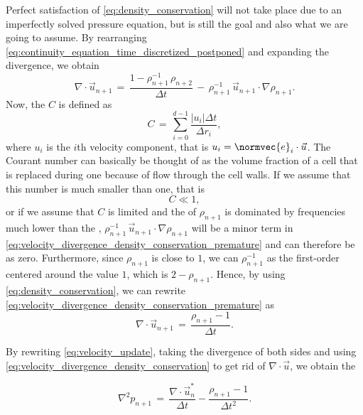 Perfect satisfaction of \eqref{eq:density_conservation} will not take place due to an imperfectly solved pressure equation, but is still the goal and also what we are going to assume. By rearranging \eqref{eq:continuity_equation_time_discretized_postponed} and expanding the divergence, we obtain
%
\begin{equation} \label{eq:velocity_divergence_density_conservation_premature}
\nabla\cdot\vec{u}_{n+1} \,=\, \frac{1-\rho_{n+1}^{-1}\,\rho_{n+2}}{\Delta t} \,-\, \rho_{n+1}^{-1}\,\vec{u}_{n+1}\cdot\nabla\rho_{n+1}.
\end{equation}
%
Now, the  $C$ is defined as
%
\begin{equation}
C \,=\, \sum_{i=0}^{d-1} \frac{|u_i|\Delta t}{\Delta r_i},
\end{equation}
%
where $u_i$ is the $i$th velocity component, that is $u_i = \normvec{e}_i\cdot\vec{u}$. The Courant number can basically be thought of as the volume fraction of a cell that is replaced during one \timestep because of flow through the cell walls. If we assume that this number is much smaller than one, that is
%
\begin{equation}
C \ll 1,
\end{equation}
%
or if we assume that $C$ is limited and the \spectrum of $\rho_{n+1}$ is dominated by frequencies much lower than the , $\rho_{n+1}^{-1}\,\vec{u}_{n+1}\cdot\nabla\rho_{n+1}$ will be a minor term in \eqref{eq:velocity_divergence_density_conservation_premature} and can therefore be \approximated as zero. Furthermore, since $\rho_{n+1}$ is close to $1$, we can \approximate $\rho_{n+1}^{-1}$ as the first-order  centered around the value $1$, which is $2-\rho_{n+1}$. Hence, by using \eqref{eq:density_conservation}, we can rewrite \eqref{eq:velocity_divergence_density_conservation_premature} as
%
\begin{equation} \label{eq:velocity_divergence_density_conservation}
\nabla\cdot\vec{u}_{n+1} \,=\, \frac{\rho_{n+1}-1}{\Delta t}.
\end{equation}

By rewriting \eqref{eq:velocity_update}, taking the divergence of both sides and using \eqref{eq:velocity_divergence_density_conservation} to get rid of $\nabla\cdot\vec{u}$, we obtain the 

\begin{equation} \label{eq:pressure_poisson_equation_density_conservation}
\nabla^2 p_{n+1} \,=\, \frac{\nabla\cdot\vec{u}^*_n}{\Delta t} - \frac{\rho_{n+1} - 1}{\Delta t^2}.
\end{equation}

